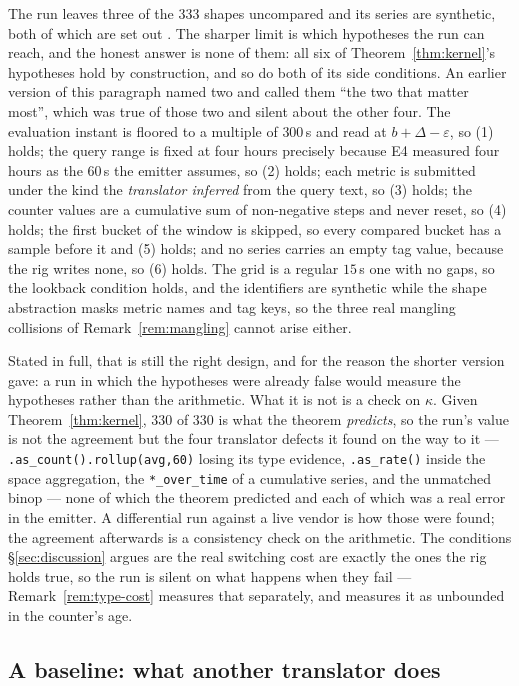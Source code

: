 The run leaves three of the $333$ shapes uncompared and its series are synthetic, both
of which are set out . The sharper limit is which hypotheses the run can
reach, and the honest answer is none of them: all six of
Theorem~\ref{thm:kernel}'s hypotheses hold by construction, and so do both of its
side conditions. An earlier version of this paragraph named two and called them ``the
two that matter most'', which was true of those two and silent about the other four.
The evaluation instant is floored to a multiple of $300$\,s and read at
$b+\Delta-\varepsilon$, so (1) holds; the query range is fixed at four hours precisely
because E4 measured four hours as the $60$\,s the emitter assumes, so (2) holds; each
metric is submitted under the kind the \emph{translator inferred} from the query text,
so (3) holds; the counter values are a cumulative sum of non-negative steps and never
reset, so (4) holds; the first bucket of the window is skipped, so every compared bucket
has a sample before it and (5) holds; and no series carries an empty tag value, because
the rig writes none, so (6) holds. The grid is a regular $15$\,s one with no gaps, so the lookback condition holds,
and the identifiers are synthetic while the shape abstraction masks metric names and tag
keys, so the three real mangling collisions of Remark~\ref{rem:mangling} cannot arise
either.

Stated in full, that is still the right design, and for the reason the shorter version
gave: a run in which the hypotheses were already false would measure the hypotheses
rather than the arithmetic. What it is not is a check on $\kappa$. Given
Theorem~\ref{thm:kernel}, $330$ of $330$ is what the theorem \emph{predicts}, so the
run's value is not the agreement but the four translator defects it found on the way to
it --- \texttt{.as\_count().rollup(avg,60)} losing its type evidence, \texttt{.as\_rate()}
inside the space aggregation, the \texttt{*\_over\_time} of a cumulative series, and the
unmatched binop --- none of which the theorem predicted and each of which was a real
error in the emitter. A differential run against a live vendor is how those were found;
the agreement afterwards is a consistency check on the arithmetic. The conditions
\S\ref{sec:discussion} argues are the real switching cost are exactly the ones the rig
holds true, so the run is silent on what happens when they fail ---
Remark~\ref{rem:type-cost} measures that separately, and measures it as unbounded in the
counter's age.

\subsection{A baseline: what another translator does}
\label{sec:baseline}

